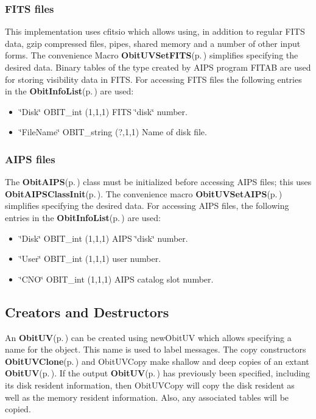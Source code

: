 \subsubsection{FITS files}\label{ObitUV_8h_UVFITS}
This implementation uses cfitsio which allows using, in addition to regular FITS data, gzip compressed files, pipes, shared memory and a number of other input forms. The convenience Macro {\bf Obit\-UVSet\-FITS}{\rm (p.\,\pageref{ObitUV_8h_a3})} simplifies specifying the desired data. Binary tables of the type created by AIPS program FITAB are used for storing visibility data in FITS. For accessing FITS files the following entries in the {\bf Obit\-Info\-List}{\rm (p.\,\pageref{structObitInfoList})} are used: \begin{itemize}
\item \char`\"{}Disk\char`\"{} OBIT\_\-int (1,1,1) FITS \char`\"{}disk\char`\"{} number. \item \char`\"{}File\-Name\char`\"{} OBIT\_\-string (?,1,1) Name of disk file.\end{itemize}
\subsubsection{AIPS files}\label{ObitUV_8h_ObitUVAIPS}
The {\bf Obit\-AIPS}{\rm (p.\,\pageref{structObitAIPS})} class must be initialized before accessing AIPS files; this uses {\bf Obit\-AIPSClass\-Init}{\rm (p.\,\pageref{ObitAIPS_8c_a5})}. The convenience macro {\bf Obit\-UVSet\-AIPS}{\rm (p.\,\pageref{ObitUV_8h_a4})} simplifies specifying the desired data. For accessing AIPS files, the following entries in the {\bf Obit\-Info\-List}{\rm (p.\,\pageref{structObitInfoList})} are used: \begin{itemize}
\item \char`\"{}Disk\char`\"{} OBIT\_\-int (1,1,1) AIPS \char`\"{}disk\char`\"{} number. \item \char`\"{}User\char`\"{} OBIT\_\-int (1,1,1) user number. \item \char`\"{}CNO\char`\"{} OBIT\_\-int (1,1,1) AIPS catalog slot number.\end{itemize}
\subsection{Creators and Destructors}\label{ObitUV_8h_ObitUVaccess}
An {\bf Obit\-UV}{\rm (p.\,\pageref{structObitUV})} can be created using new\-Obit\-UV which allows specifying a name for the object. This name is used to label messages. The copy constructors {\bf Obit\-UVClone}{\rm (p.\,\pageref{ObitUV_8c_a18})} and Obit\-UVCopy make shallow and deep copies of an extant {\bf Obit\-UV}{\rm (p.\,\pageref{structObitUV})}. If the output {\bf Obit\-UV}{\rm (p.\,\pageref{structObitUV})} has previously been specified, including its disk resident information, then Obit\-UVCopy will copy the disk resident as well as the memory resident information. Also, any associated tables will be copied.

